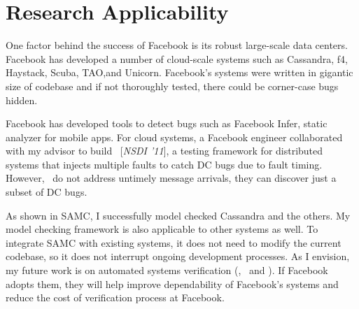 \documentclass[11pt]{article}
\begin{document}
\section{Research Applicability}

One factor behind the success of Facebook is its robust large-scale data
centers. Facebook has developed a number of cloud-scale systems such as
Cassandra, f4, Haystack, Scuba, TAO,and Unicorn. Facebook's systems were
written in gigantic size of codebase and if not thoroughly tested, there could
be corner-case bugs hidden.

Facebook has developed tools to detect bugs such as Facebook Infer, static
analyzer for mobile apps. For cloud systems, a Facebook engineer collaborated
with my advisor to build \fad\ [\textit{NSDI '11}], a testing framework for
distributed systems that injects multiple faults to catch DC bugs due to fault
timing. However, \fad\ do not address untimely message arrivals, they can
discover just a subset of DC bugs.

As shown in SAMC, I successfully model checked Cassandra and the others. My
model checking framework is also applicable to other systems as well. To
integrate SAMC with existing systems, it does not need to modify the current
codebase, so it does not interrupt ongoing development processes. As I envision,
my future work is on automated systems verification (\ie, \autocheck\ and
\deepcheck). If Facebook adopts them, they will help improve dependability of
Facebook's systems and reduce the cost of verification process at Facebook.
\end{document}
